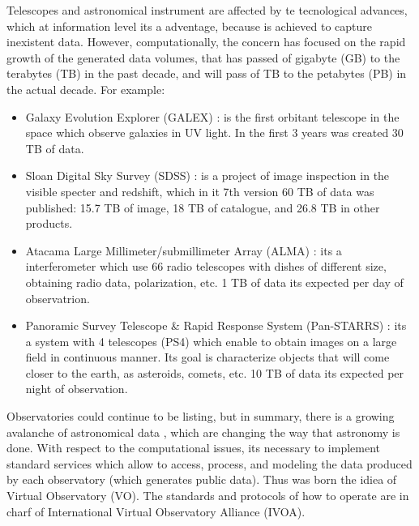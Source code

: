 Telescopes and astronomical instrument are affected by te tecnological
advances, which at information level its a adventage, because is achieved to
capture inexistent data. However, computationally, the concern has focused on
the rapid growth of the generated data volumes, that has passed of gigabyte
(GB) to the terabytes (TB) in the past decade, and will pass of TB to the
petabytes (PB) in the actual decade. For example:
\begin{itemize}
	\item Galaxy Evolution Explorer (GALEX) \cite{galex}: is the first
orbitant telescope in the space which observe galaxies in UV light. In the
first 3 years was created 30 TB of data.
	\item Sloan Digital Sky Survey (SDSS) \cite{sloan}: is a project of
image inspection in the visible specter and redshift, which in it 7th version
60 TB of data was published: 15.7 TB of image, 18 TB of catalogue, and 26.8 TB
in other products.
	\item Atacama Large Millimeter/submillimeter Array (ALMA) \cite{alma}:
its a interferometer which use 66 radio telescopes with dishes of different
size, obtaining radio data, polarization, etc. 1 TB of data its expected per
day of observatrion.
	\item Panoramic Survey Telescope \& Rapid Response System (Pan-STARRS)
\cite{pan}: its a system with 4 telescopes (PS4) which enable to obtain images
on a large field in continuous manner. Its goal is characterize objects that
will come closer to the earth, as asteroids, comets, etc. 10 TB of data its
expected per night of observation.
\end{itemize}


Observatories could continue to be listing, but in summary, there is a growing
avalanche of astronomical data \cite{kborne}, which are changing the way that
astronomy is done. With respect to the computational issues, its necessary to
implement standard services which allow to access, process, and modeling the
data produced by each observatory (which generates public data). Thus was born
the idiea of Virtual Observatory (VO). The standards and protocols of how to
operate are in charf of International Virtual Observatory Alliance (IVOA). 

